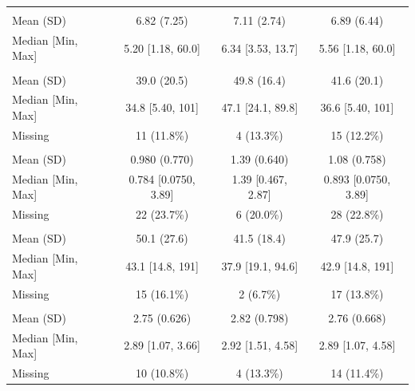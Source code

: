 \documentclass[]{article}
\begin{document}
\begin{tabular}{lccc}
\addlinespace[0.3em]
\multicolumn{4}{l}{\textbf{SOCPSA}}\\
\hspace{1em}Mean (SD) & 6.82 (7.25) & 7.11 (2.74) & 6.89 (6.44)\\
\hspace{1em}Median [Min, Max] & 5.20 [1.18, 60.0] & 6.34 [3.53, 13.7] & 5.56 [1.18, 60.0]\\
\addlinespace[0.3em]
\multicolumn{4}{l}{\textbf{PHI}}\\
\hspace{1em}Mean (SD) & 39.0 (20.5) & 49.8 (16.4) & 41.6 (20.1)\\
\hspace{1em}Median [Min, Max] & 34.8 [5.40, 101] & 47.1 [24.1, 89.8] & 36.6 [5.40, 101]\\
\hspace{1em}Missing & 11 (11.8\%) & 4 (13.3\%) & 15 (12.2\%)\\
\addlinespace[0.3em]
\multicolumn{4}{l}{\textbf{PHIDensity}}\\
\hspace{1em}Mean (SD) & 0.980 (0.770) & 1.39 (0.640) & 1.08 (0.758)\\
\hspace{1em}Median [Min, Max] & 0.784 [0.0750, 3.89] & 1.39 [0.467, 2.87] & 0.893 [0.0750, 3.89]\\
\hspace{1em}Missing & 22 (23.7\%) & 6 (20.0\%) & 28 (22.8\%)\\
\addlinespace[0.3em]
\multicolumn{4}{l}{\textbf{Prostate Volume (cm\textasciicircum{}3)}}\\
\hspace{1em}Mean (SD) & 50.1 (27.6) & 41.5 (18.4) & 47.9 (25.7)\\
\hspace{1em}Median [Min, Max] & 43.1 [14.8, 191] & 37.9 [19.1, 94.6] & 42.9 [14.8, 191]\\
\hspace{1em}Missing & 15 (16.1\%) & 2 (6.7\%) & 17 (13.8\%)\\
\addlinespace[0.3em]
\multicolumn{4}{l}{\textbf{TNFaAverage}}\\
\hspace{1em}Mean (SD) & 2.75 (0.626) & 2.82 (0.798) & 2.76 (0.668)\\
\hspace{1em}Median [Min, Max] & 2.89 [1.07, 3.66] & 2.92 [1.51, 4.58] & 2.89 [1.07, 4.58]\\
\hspace{1em}Missing & 10 (10.8\%) & 4 (13.3\%) & 14 (11.4\%)\\
\bottomrule
\end{tabular}
\end{document}
